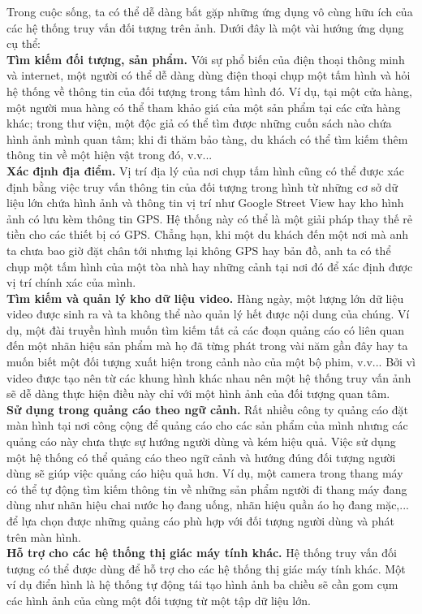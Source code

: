 Trong cuộc sống, ta có thể dễ dàng bắt gặp những ứng dụng vô cùng hữu ích của các hệ thống truy vấn đối tượng trên ảnh. Dưới đây là một vài hướng ứng dụng cụ thể:\\
\textbf{Tìm kiếm đối tượng, sản phẩm.} Với sự phổ biến của điện thoại thông minh và internet, một người có thể dễ dàng dùng điện thoại chụp một tấm hình và hỏi hệ thống về thông tin của đối tượng trong tấm hình đó. Ví dụ, tại một cửa hàng, một người mua hàng có thể tham khảo giá của một sản phẩm tại các cửa hàng khác; trong thư viện, một độc giả có thể tìm được những cuốn sách nào chứa hình ảnh mình quan tâm; khi đi thăm bảo tàng, du khách có thể tìm kiếm thêm thông tin về một hiện vật trong đó, v.v...\\
\textbf{Xác định địa điểm.} Vị trí địa lý của nơi chụp tấm hình cũng có thể được xác định bằng việc truy vấn thông tin của đối tượng trong hình từ những cơ sở dữ liệu lớn chứa hình ảnh và thông tin vị trí như Google Street View hay kho hình ảnh có lưu kèm thông tin GPS. Hệ thống này có thể là một giải pháp thay thế rẻ tiền cho các thiết bị có GPS. Chẳng hạn, khi một du khách đến một nơi mà anh ta chưa bao giờ đặt chân tới nhưng lại không GPS hay bản đồ, anh ta có thể chụp một tấm hình của một tòa nhà hay những cảnh tại nơi đó để xác định được vị trí chính xác của mình.\\
\textbf{Tìm kiếm và quản lý kho dữ liệu video.} Hàng ngày, một lượng lớn dữ liệu video được sinh ra và ta không thể nào quản lý hết được nội dung của chúng. Ví dụ, một đài truyền hình muốn tìm kiếm tất cả các đoạn quảng cáo có liên quan đến một nhãn hiệu sản phẩm mà họ đã từng phát trong vài năm gần đây hay ta muốn biết một đối tượng xuất hiện trong cảnh nào của một bộ phim, v.v... Bởi vì video được tạo nên từ các khung hình khác nhau nên một hệ thống truy vấn ảnh sẽ dễ dàng thực hiện điều này chỉ với một hình ảnh của đối tượng quan tâm.\\
\textbf{Sử dụng trong quảng cáo theo ngữ cảnh.} Rất nhiều công ty quảng cáo đặt màn hình tại nơi công cộng để quảng cáo cho các sản phẩm của mình nhưng các quảng cáo này chưa thực sự hướng người dùng và kém hiệu quả. Việc sử dụng một hệ thống có thể quảng cáo theo ngữ cảnh và hướng đúng đối tượng người dùng sẽ giúp việc quảng cáo hiệu quả hơn. Ví dụ, một camera trong thang máy có thể tự động tìm kiếm thông tin về những sản phẩm người đi thang máy đang dùng như nhãn hiệu chai nước họ đang uống, nhãn hiệu quần áo họ đang mặc,... để lựa chọn được những quảng cáo phù hợp với đối tượng người dùng và phát trên màn hình.\\
\textbf{Hỗ trợ cho các hệ thống thị giác máy tính khác.} Hệ thống truy vấn đối tượng có thể được dùng để hỗ trợ cho các hệ thống thị giác máy tính khác. Một ví dụ điển hình là hệ thống tự động tái tạo hình ảnh ba chiều sẽ cần gom cụm các hình ảnh của cùng một đối tượng từ một tập dữ liệu lớn.\\
